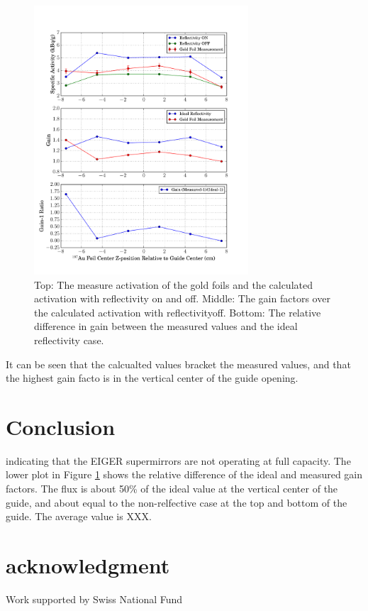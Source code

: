 \documentclass[a4paper,
              ]{jacow}
\begin{document}
\begin{figure}[!htb]
   \centering
   \includegraphics*[trim = 0mm 0mm 15mm 0mm, width=80mm]{graphics/GF_act.pdf}
   \caption{Top: The measure activation of the gold foils and the calculated activation with reflectivity on and off.  Middle:  The gain factors over the calculated activation with reflectivityoff.  Bottom:  The relative difference in gain between the measured values and the ideal reflectivity case.}
   \label{activation}
\end{figure}

It can be seen that the calcualted values bracket the measured values, and that the highest gain facto is in the vertical center of the guide opening.


\section{Conclusion}

indicating that the EIGER supermirrors are not operating at full capacity.  The lower plot in Figure \ref{activation} shows the relative difference of the ideal and measured gain factors.  The flux is about 50\% of the ideal value at the vertical center of the guide, and about equal to the non-relfective case at the top and bottom of the guide.  The average value is XXX.


\section{acknowledgment}

Work supported by Swiss National Fund
\end{document}
